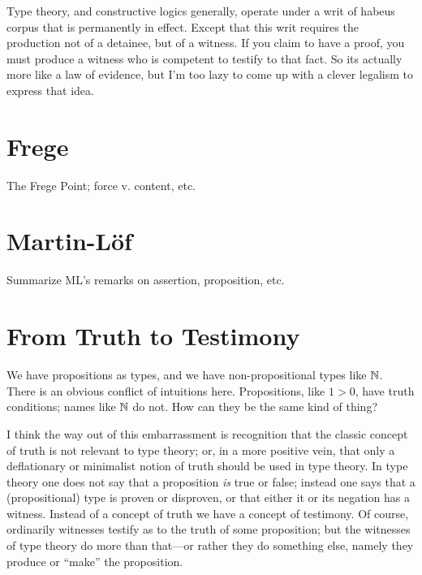 Type theory, and constructive logics generally, operate under a writ
of habeus corpus that is permanently in effect.  Except that this writ
requires the production not of a detainee, but of a witness.  If you
claim to have a proof, you must produce a witness who is competent to
testify to that fact.  So its actually more like a law of evidence,
but I'm too lazy to come up with a clever legalism to express that
idea.




\section{Frege}
\label{sect:frege}

{\todo The Frege Point; force v. content, etc.}


\section{Martin-L\"{o}f}
\label{sect:ml}

{\todo Summarize ML's remarks on assertion, proposition, etc.}



\section{From Truth to Testimony}
\label{sect:truth}

We have propositions as types, and we have non-propositional types
like $\mathbb{N}$.  There is an obvious conflict of intuitions here.
Propositions, like \(1>0\), have truth conditions; names like \(\mathbb{N}\)
do not.  How can they be the same kind of thing?

I think the way out of this embarrassment is recognition that the
classic concept of truth is not relevant to type theory; or, in a more
positive vein, that only a deflationary or minimalist notion of truth
should be used in type theory.  In type theory one does not say that a
proposition \textit{is} true or false; instead one says that a
(propositional) type is proven or disproven, or that either it or its
negation has a witness.  Instead of a concept of truth we have a
concept of testimony.  Of course, ordinarily witnesses testify as to
the truth of some proposition; but the witnesses of type theory do
more than that---or rather they do something else, namely they produce
or ``make'' the proposition.

